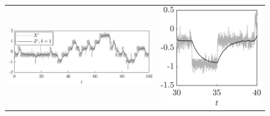 \documentclass[10pt]{article}
\begin{document}
\begin{figure}[t]
	\centering
	\begin{tabular}{cc}
		\includegraphics[]{Figures/TrajD1} & \includegraphics[]{Figures/TrajD1Z}\\

\end{tabular}
\end{figure}
\end{document}

